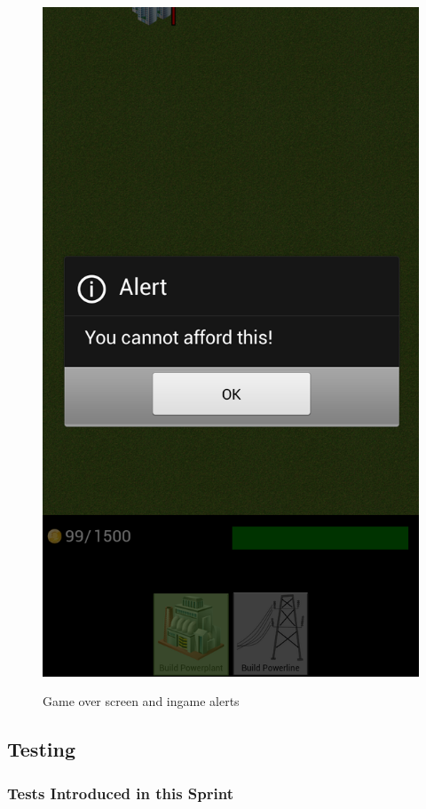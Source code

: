 \begin{figure}[H]
{		\includegraphics[scale=0.17]{pictures/sprint2-screen/sprint2-11}
	}
	\caption{Game over screen and ingame alerts}
	\end{figure}

\clearpage
\subsection{Testing}

	\subsubsection{Tests Introduced in this Sprint}

